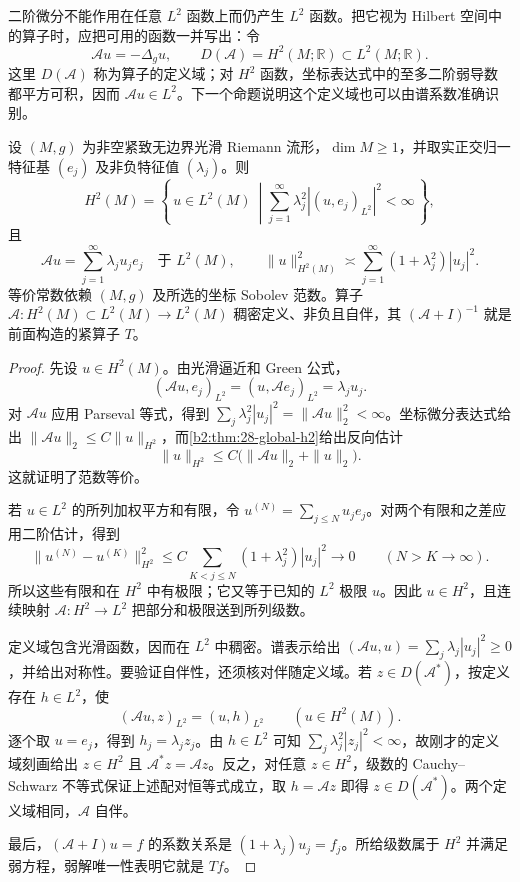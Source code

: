 二阶微分不能作用在任意 \(L^2\) 函数上而仍产生 \(L^2\) 函数。把它视为 Hilbert 空间中的算子时，应把可用的函数一并写出：令
\[
 \mathcal A u=-\Delta_g u,\qquad D(\mathcal A)=H^2(M;\mathbb R)\subset L^2(M;\mathbb R).
\]
这里 \(D(\mathcal A)\) 称为算子的定义域；对 \(H^2\) 函数，坐标表达式中的至多二阶弱导数都平方可积，因而 \(\mathcal A u\in L^2\)。下一个命题说明这个定义域也可以由谱系数准确识别。

\begin{proposition}\label{b2:prop:26-selfadjoint-domain}
设 \((M,g)\) 为非空紧致无边界光滑 Riemann 流形，\(\dim M\geq1\)，并取实正交归一特征基 \((e_j)\) 及非负特征值 \((\lambda_j)\)。则
\[
 H^2(M)=\left\{\,u\in L^2(M)\ \middle|
       \sum_{j=1}^\infty\lambda_j^2|(u,e_j)_{L^2}|^2<\infty\,\right\},
\]
且
\[
 \mathcal A u=\sum_{j=1}^\infty\lambda_j u_je_j\quad\text{于 }L^2(M),
 \qquad
 \|u\|_{H^2(M)}^2\asymp\sum_{j=1}^\infty(1+\lambda_j^2)|u_j|^2.
\]
等价常数依赖 \((M,g)\) 及所选的坐标 Sobolev 范数。算子 \(\mathcal A:H^2(M)\subset L^2(M)\rightarrow L^2(M)\) 稠密定义、非负且自伴，其 \((\mathcal A+I)^{-1}\) 就是前面构造的紧算子 \(T\)。
\end{proposition}
\begin{proof}
先设 \(u\in H^2(M)\)。由光滑逼近和 Green 公式，
\[
 (\mathcal A u,e_j)_{L^2}=(u,\mathcal A e_j)_{L^2}=\lambda_ju_j.
\]
对 \(\mathcal A u\) 应用 Parseval 等式，得到 \(\sum_j\lambda_j^2|u_j|^2=\|\mathcal A u\|_2^2<\infty\)。坐标微分表达式给出 \(\|\mathcal A u\|_2\leq C\|u\|_{H^2}\)，而\cref{b2:thm:28-global-h2}给出反向估计
\[
 \|u\|_{H^2}\leq C\bigl(\|\mathcal A u\|_2+\|u\|_2\bigr).
\]
这就证明了范数等价。

若 \(u\in L^2\) 的所列加权平方和有限，令 \(u^{(N)}=\sum_{j\leq N}u_je_j\)。对两个有限和之差应用二阶估计，得到
\[
 \|u^{(N)}-u^{(K)}\|_{H^2}^2
 \leq C\sum_{K<j\leq N}(1+\lambda_j^2)|u_j|^2
 \longrightarrow0\qquad(N>K\longrightarrow\infty).
\]
所以这些有限和在 \(H^2\) 中有极限；它又等于已知的 \(L^2\) 极限 \(u\)。因此 \(u\in H^2\)，且连续映射 \(\mathcal A:H^2\rightarrow L^2\) 把部分和极限送到所列级数。

定义域包含光滑函数，因而在 \(L^2\) 中稠密。谱表示给出
\((\mathcal Au,u)=\sum_j\lambda_j|u_j|^2\geq0\)，并给出对称性。要验证自伴性，还须核对伴随定义域。若 \(z\in D(\mathcal A^*)\)，按定义存在 \(h\in L^2\)，使
\[
 (\mathcal Au,z)_{L^2}=(u,h)_{L^2}\qquad(u\in H^2(M)).
\]
逐个取 \(u=e_j\)，得到 \(h_j=\lambda_jz_j\)。由 \(h\in L^2\) 可知 \(\sum_j\lambda_j^2|z_j|^2<\infty\)，故刚才的定义域刻画给出 \(z\in H^2\) 且 \(\mathcal A^*z=\mathcal Az\)。反之，对任意 \(z\in H^2\)，级数的 Cauchy--Schwarz 不等式保证上述配对恒等式成立，取 \(h=\mathcal Az\) 即得 \(z\in D(\mathcal A^*)\)。两个定义域相同，\(\mathcal A\) 自伴。

最后，\((\mathcal A+I)u=f\) 的系数关系是 \((1+\lambda_j)u_j=f_j\)。所给级数属于 \(H^2\) 并满足弱方程，弱解唯一性表明它就是 \(Tf\)。
\end{proof}

